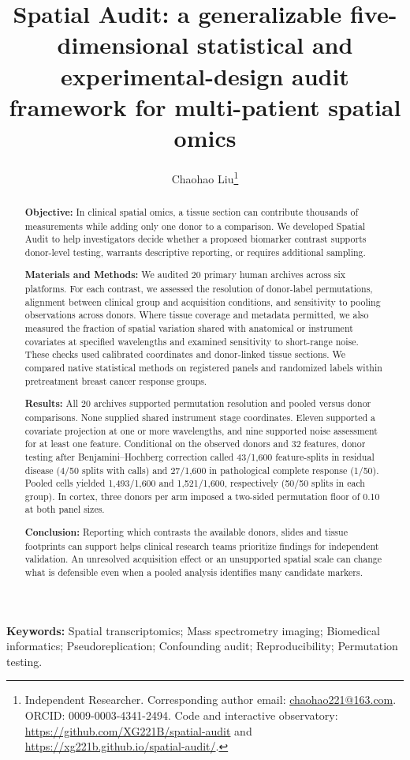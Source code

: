 \documentclass[11pt]{article}
\title{Spatial Audit: a generalizable five-dimensional statistical and experimental-design audit framework for multi-patient spatial omics}
\author{Chaohao Liu\thanks{Independent Researcher. Corresponding author email: \href{mailto:chaohao221@163.com}{chaohao221@163.com}. ORCID: 0009-0003-4341-2494. Code and interactive observatory: \url{https://github.com/XG221B/spatial-audit} and \url{https://xg221b.github.io/spatial-audit/}.}}
\date{}
\begin{document}
\maketitle

\begin{abstract}
\noindent\textbf{Objective:} In clinical spatial omics, a tissue section can contribute thousands of measurements while adding only one donor to a comparison. We developed Spatial Audit to help investigators decide whether a proposed biomarker contrast supports donor-level testing, warrants descriptive reporting, or requires additional sampling.

\noindent\textbf{Materials and Methods:} We audited 20 primary human archives across six platforms. For each contrast, we assessed the resolution of donor-label permutations, alignment between clinical group and acquisition conditions, and sensitivity to pooling observations across donors. Where tissue coverage and metadata permitted, we also measured the fraction of spatial variation shared with anatomical or instrument covariates at specified wavelengths and examined sensitivity to short-range noise. These checks used calibrated coordinates and donor-linked tissue sections. We compared native statistical methods on registered panels and randomized labels within pretreatment breast cancer response groups.

\noindent\textbf{Results:} All 20 archives supported permutation resolution and pooled versus donor comparisons. None supplied shared instrument stage coordinates. Eleven supported a covariate projection at one or more wavelengths, and nine supported noise assessment for at least one feature. Conditional on the observed donors and 32 features, donor testing after Benjamini--Hochberg correction called 43/1,600 feature-splits in residual disease (4/50 splits with calls) and 27/1,600 in pathological complete response (1/50). Pooled cells yielded 1,493/1,600 and 1,521/1,600, respectively (50/50 splits in each group). In cortex, three donors per arm imposed a two-sided permutation floor of 0.10 at both panel sizes.

\noindent\textbf{Conclusion:} Reporting which contrasts the available donors, slides and tissue footprints can support helps clinical research teams prioritize findings for independent validation. An unresolved acquisition effect or an unsupported spatial scale can change what is defensible even when a pooled analysis identifies many candidate markers.

\end{abstract}
\noindent\textbf{Keywords:} Spatial transcriptomics; Mass spectrometry imaging; Biomedical informatics; Pseudoreplication; Confounding audit; Reproducibility; Permutation testing.
\end{document}
